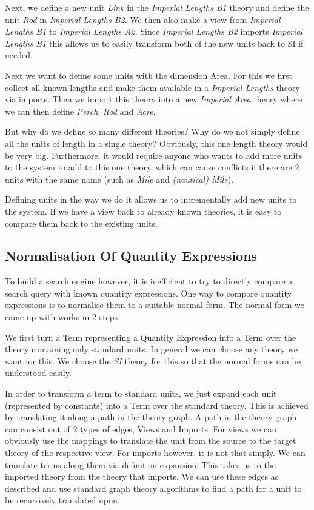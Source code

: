 Next, we define a new unit \textit{Link} in the \textit{Imperial Lengths B1} theory and define the unit \textit{Rod} in \textit{Imperial Lengths B2}. We then also make a view from \textit{Imperial Lengths B1} to \textit{Imperial Lengths A2}. Since \textit{Imperial Lengths B2} imports \textit{Imperial Lengths B1} this allows us to easily transform both of the new units back to SI if needed.

Next we want to define some units with the dimension Area. For this we first collect all known lengths and make them available in a \textit{Imperial Lengths} theory via imports. Then we import this theory into a new \textit{Imperial Area} theory where we can then define \textit{Perch}, \textit{Rod} and \textit{Acre}.

But why do we define so many different theories? Why do we not simply define all the units of length in a single theory? Obviously, this one length theory would be very big. Furthermore, it would require anyone who wants to add more units to the system to add to this one theory, which can cause conflicts if there are 2 units with the same name (such as \textit{Mile} and \textit{(nautical) Mile}).

Defining units in the way we do it allows us to incrementally add new units to the system. If we have a view back to already known theories, it is easy to compare them back to the existing units.

\subsection{Normalisation Of Quantity Expressions}
\label{sec:norm}

To build a search engine however, it is inefficient to try to directly compare a search query with known quantity expressions. One way to compare quantity expressions is to normalise them to a suitable normal form. The normal form we came up with works in 2 steps.

We first turn a Term representing a Quantity Expression into a Term over the theory containing only standard units. In general we can choose any theory we want for this. We choose the \textit{SI} theory for this so that the normal forms can be understood easily.

In order to transform a term to standard units, we just expand each unit (represented by constants) into a Term over the standard theory. This is achieved by translating it along a path in the theory graph. A path in the theory graph can consist out of 2 types of edges, Views and Imports. For views we can obviously use the mappings to translate the unit from the source to the target theory of the respective view. For imports however, it is not that simply. We can translate terms along them via definition expansion. This takes us to the imported theory from the theory that imports. We can use these edges as described and use standard graph theory algorithms to find a path for a unit to be recursively translated upon.

